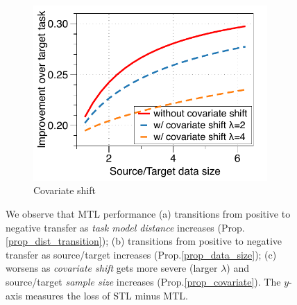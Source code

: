 \begin{figure}[!t]
\begin{subfigure}[b]{0.32\textwidth}
		\centering
		\includegraphics[width=0.98\textwidth]{figures/complementary.pdf}
		\vspace{-0.075in}
		\caption{Covariate shift}
		\label{fig_covariate}
	\end{subfigure}
	\caption{%
	We observe that MTL performance
	(a) transitions from positive to negative transfer as \textit{task model distance} increases (Prop.\;\ref{prop_dist_transition});
	(b) transitions from positive to negative transfer as source/target  increases (Prop.\;\ref{prop_data_size});
	(c) worsens as \textit{covariate shift} gets more severe (larger $\lambda$) and source/target \textit{sample size} increases (Prop.\;\ref{prop_covariate}).
	The $y$-axis measures the loss of STL minus MTL.}
	\label{fig_model_shift_phasetrans}
	\vspace{-0.2in}
\end{figure}





